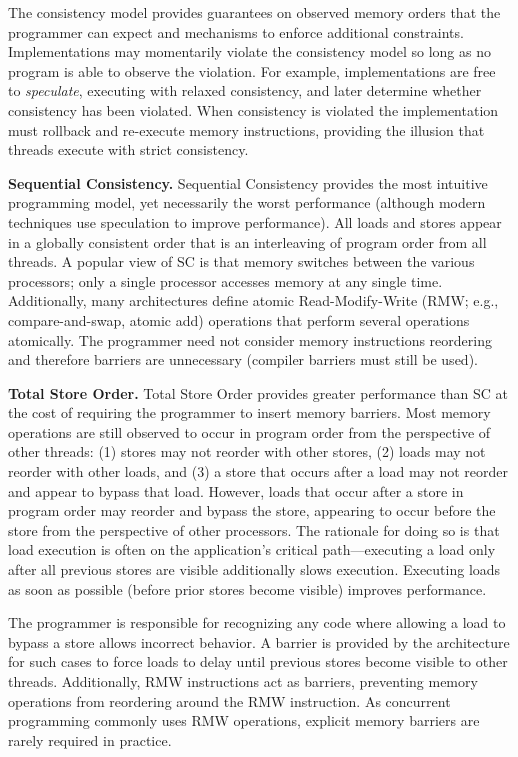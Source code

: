 The consistency model provides guarantees on observed memory orders that the programmer can expect and mechanisms to enforce additional constraints.
Implementations may momentarily violate the consistency model so long as no program is able to observe the violation.
For example, implementations are free to \emph{speculate}, executing with relaxed consistency, and later determine whether consistency has been violated.
When consistency is violated the implementation must rollback and re-execute memory instructions, providing the illusion that threads execute with strict consistency.

\textbf{Sequential Consistency.}
Sequential Consistency \cite{Lamport79} provides the most intuitive programming model, yet necessarily the worst performance (although modern techniques use speculation to improve performance).
All loads and stores appear in a globally consistent order that is an interleaving of program order from all threads.
A popular view of SC is that memory switches between the various processors; only a single processor accesses memory at any single time.
Additionally, many architectures define atomic Read-Modify-Write (RMW; e.g., compare-and-swap, atomic add) operations that perform several operations atomically.
The programmer need not consider memory instructions reordering and therefore barriers are unnecessary (compiler barriers must still be used).

\textbf{Total Store Order.}
Total Store Order \cite{SPARCv9} provides greater performance than SC at the cost of requiring the programmer to insert memory barriers.
Most memory operations are still observed to occur in program order from the perspective of other threads: (1) stores may not reorder with other stores, (2) loads may not reorder with other loads, and (3) a store that occurs after a load may not reorder and appear to bypass that load.
However, loads that occur after a store in program order may reorder and bypass the store, appearing to occur before the store from the perspective of other processors.
The rationale for doing so is that load execution is often on the application's critical path---executing a load only after all previous stores are visible additionally slows execution.
Executing loads as soon as possible (before prior stores become visible) improves performance.

The programmer is responsible for recognizing any code where allowing a load to bypass a store allows incorrect behavior.
A barrier is provided by the architecture for such cases to force loads to delay until previous stores become visible to other threads.
Additionally, RMW instructions act as barriers, preventing memory operations from reordering around the RMW instruction.
As concurrent programming commonly uses RMW operations, explicit memory barriers are rarely required in practice.


